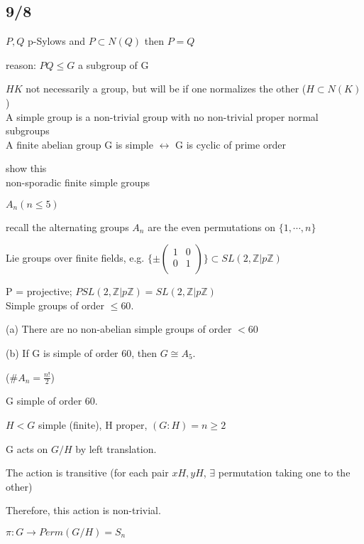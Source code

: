 \documentclass[12pt]{article}
\begin{document}
\subsection{9/8}

\noindent
$P, Q$ p-Sylows and $P \subset N(Q)$ then $P = Q$

reason: $PQ \leq G$ a subgroup of G

$HK$ not necessarily a group, but will be if one normalizes the other ($H \subset N(K)$)\\

\noindent
A simple group is a non-trivial group with no non-trivial proper normal subgroups\\

\noindent
A finite abelian group G is simple $\leftrightarrow$ G is cyclic of prime order

show this\\

\noindent
non-sporadic finite simple groups

$A_n (n \leq 5)$

recall the alternating groups $A_n$ are the even permutations on $\{1, \cdots, n\}$

Lie groups over finite fields, e.g. $\{\pm \begin{pmatrix} 1 & 0 \\ 0 & 1 \\ \end{pmatrix}\} \subset SL(2, \mathds{Z}|p\mathds{Z})$

P = projective; $PSL(2, \mathds{Z}|p\mathds{Z}) = SL(2, \mathds{Z}|p\mathds{Z})$\\

\noindent
Simple groups of order $\leq 60$.

(a) There are no non-abelian simple groups of order $< 60$

(b) If G is simple of order 60, then $G \cong A_5$.

($\#A_n = \frac{n!}{2}$)

\noindent
G simple of order 60.

$H < G$ simple (finite), H proper, $(G: H) = n \geq 2$

G acts on $G\slash H$ by left translation.

The action is transitive (for each pair $xH, yH$, $\exists$ permutation taking one to the other)

Therefore, this action is non-trivial.

$\pi : G \to Perm(G\slash H) = S_n$
\end{document}

